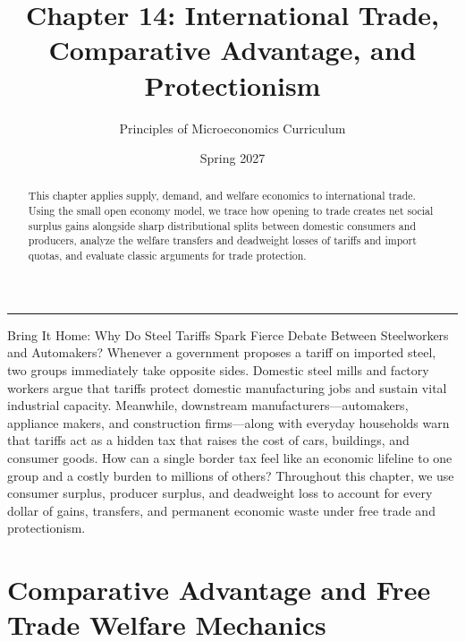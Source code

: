 \documentclass[11pt,letterpaper]{article}
\begin{document}
\title{\Huge\bfseries\color{SlateBlue} Chapter 14: International Trade, Comparative Advantage, and Protectionism}
\author{\large Principles of Microeconomics Curriculum}
\date{Spring 2027}
\maketitle

\thispagestyle{plain}

\begin{abstract}
This chapter applies supply, demand, and welfare economics to international trade. Using the small open economy model, we trace how opening to trade creates net social surplus gains alongside sharp distributional splits between domestic consumers and producers, analyze the welfare transfers and deadweight losses of tariffs and import quotas, and evaluate classic arguments for trade protection.
\end{abstract}

\tableofcontents
\vspace{1.5em}
\hrule
\vspace{1.5em}

\begin{examplecase}{Bring It Home: Why Do Steel Tariffs Spark Fierce Debate Between Steelworkers and Automakers?}
Whenever a government proposes a tariff on imported steel, two groups immediately take opposite sides. Domestic steel mills and factory workers argue that tariffs protect domestic manufacturing jobs and sustain vital industrial capacity. Meanwhile, downstream manufacturers---automakers, appliance makers, and construction firms---along with everyday households warn that tariffs act as a hidden tax that raises the cost of cars, buildings, and consumer goods. How can a single border tax feel like an economic lifeline to one group and a costly burden to millions of others? Throughout this chapter, we use consumer surplus, producer surplus, and deadweight loss to account for every dollar of gains, transfers, and permanent economic waste under free trade and protectionism.
\end{examplecase}

\section{Comparative Advantage and Free Trade Welfare Mechanics}
\end{document}
